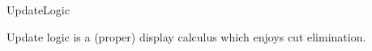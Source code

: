 \begin{entry}{UpdateLogic}

 \begin{technicalities}
Update logic  is a (proper) display calculus which  enjoys  cut elimination. %
 \end{technicalities}

\end{entry}
